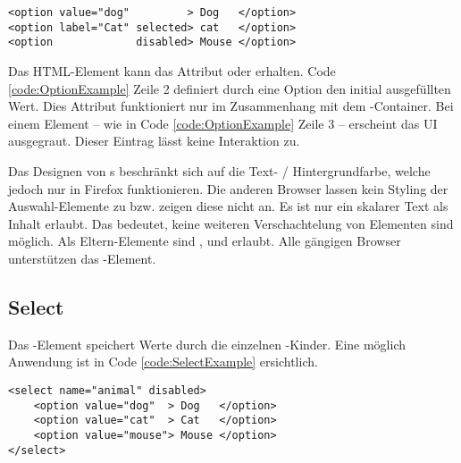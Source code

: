 \begin{lstlisting}[style = htmlcssjs, caption = Option Beispiel, label = code:OptionExample]
<option value="dog"         > Dog   </option>
<option label="Cat" selected> cat   </option>
<option             disabled> Mouse </option>
\end{lstlisting}    

Das HTML-Element kann das Attribut  oder  erhalten.
Code \ref{code:OptionExample} Zeile 2 definiert durch eine  Option den initial ausgefüllten Wert.
Dies Attribut funktioniert nur im Zusammenhang mit dem -Container. 
Bei einem  Element – wie in Code \ref{code:OptionExample} Zeile 3 – erscheint das UI ausgegraut.
Dieser Eintrag lässt keine Interaktion zu.

Das Designen von s beschränkt sich auf die Text- / Hintergrundfarbe, welche jedoch nur in Firefox funktionieren. 
Die anderen Browser lassen kein Styling der Auswahl-Elemente zu bzw. zeigen diese nicht an.
Es ist nur ein skalarer Text als Inhalt erlaubt. 
Das bedeutet, keine weiteren Verschachtelung von Elementen sind möglich.
Als Eltern-Elemente sind ,  und  erlaubt.
Alle gängigen Browser unterstützen das -Element.


\subsection{Select}
\label{sec:select}

Das -Element speichert Werte durch die einzelnen -Kinder.
Eine möglich Anwendung ist in Code \ref{code:SelectExample} ersichtlich.

\begin{lstlisting}[style = htmlcssjs, caption = Disabled Select Beispiel, label = code:SelectExample]
<select name="animal" disabled>
    <option value="dog"  > Dog   </option>
    <option value="cat"  > Cat   </option>
    <option value="mouse"> Mouse </option>
</select>
\end{lstlisting}

